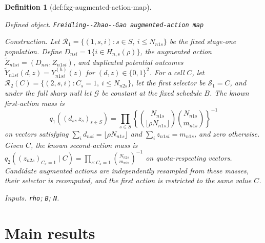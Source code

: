 \documentclass{article}
\newtheorem{definition}{Definition}
\begin{document}
\begin{definition}[def:fzg-augmented-action-map]\label{def:fzg-augmented-action-map}
\par\smallskip\noindent\emph{Defined object.} \texttt{Freidling-\allowbreak{}-\allowbreak{}Zhao-\allowbreak{}-\allowbreak{}Gao augmented-\allowbreak{}action map}
\par\smallskip\noindent\emph{Construction.} Let \(\mathcal R_1=\{(1,s,i):s\in S,\ i\le N_{n1s}\}\) be the fixed stage-one population.  Define \(D_{nsi}=\mathbf 1\{i\in H_{n,s}(\rho)\}\), the augmented action \(\widetilde Z_{n1si}=(D_{nsi},Z_{n1si})\), and duplicated potential outcomes \(\widetilde Y_{n1si}(d,z)=Y^{(h)}_{n1si}(z)\) for \((d,z)\in\{0,1\}^2\).  For a cell \(C\), let \(\mathcal R_2(C)=\{(2,s,i):C_s=1,\ i\le N_{n2s}\}\), let the first selector be \(\mathcal S_1=C\), and under the full sharp null let \(\mathcal G\) be constant at the fixed schedule \(B\).  The known first-action mass is
\[
q_1((d_s,z_s)_{s\in S})=
\prod_{s\in S}
\left\{
\binom{N_{n1s}}{\lfloor\rho N_{n1s}\rfloor}
\binom{N_{n1s}}{m_{n1s}}
\right\}^{-1}
\]
on vectors satisfying \(\sum_i d_{nsi}=\lfloor\rho N_{n1s}\rfloor\) and \(\sum_i z_{n1si}=m_{n1s}\), and zero otherwise.  Given \(C\), the known second-action mass is \(q_2((z_{n2s})_{C_s=1}\mid C)=\prod_{s:C_s=1}\binom{N_{n2s}}{m_{n2s}}^{-1}\) on quota-respecting vectors.  Candidate augmented actions are independently resampled from these masses, their selector is recomputed, and the first action is restricted to the same value \(C\).
\par\smallskip\noindent\emph{Inputs.} \texttt{rho}; \texttt{B}; \texttt{N}.
\end{definition}

\section{Main results}
\end{document}
